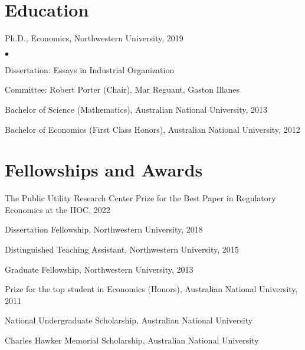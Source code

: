 \documentclass[margin,line]{res}
\newenvironment{list1}{
  \begin{list}{\ding{113}}{%
      \setlength{\itemsep}{.025in}
      \setlength{\parsep}{0in} \setlength{\parskip}{0in}
      \setlength{\topsep}{0in} \setlength{\partopsep}{0in}
      \setlength{\leftmargin}{0.17in}}}{\end{list}}
\newenvironment{list2}{
  \begin{list}{$\bullet$}{%
      \setlength{\itemsep}{0in}
      \setlength{\parsep}{0in} \setlength{\parskip}{0in}
      \setlength{\topsep}{0in} \setlength{\partopsep}{0in}
      \setlength{\leftmargin}{0.2in}}}{\end{list}}
\begin{document}
\begin{resume}
\section{ Education}\begin{tiny}

\end{tiny}
\begin{list1}
\item[] Ph.D., Economics, Northwestern University, 2019
	\begin{list2}
		\item[] Dissertation: Essays in Industrial Organization
		\item[] Committee: Robert Porter (Chair), Mar Reguant, Gaston Illanes
	\end{list2}
\item[] Bachelor of Science (Mathematics), Australian National University, 2013
\item[] Bachelor of Economics (First Class Honors), Australian National University, 2012
\end{list1}

\section{Fellowships and Awards}
\begin{list1}
\item[] The Public Utility Research Center Prize for the Best Paper in Regulatory Economics at the IIOC, 2022
\item[] Dissertation Fellowship, Northwestern University, 2018
\item[] Distinguished Teaching Assistant, Northwestern University, 2015
\item[] Graduate Fellowship, Northwestern University, 2013
\item[] Prize for the top student in Economics (Honors), Australian National University, 2011
\item[] National Undergraduate Scholarship, Australian National University
\item[] Charles Hawker Memorial Scholarship, Australian National University
\end{list1}


\end{resume}
\end{document}
